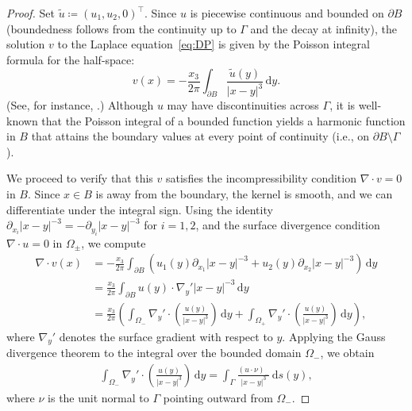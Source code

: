 \documentclass{article}
\theoremstyle{remark}
\theoremstyle{definition}
\numberwithin{equation}{section}
\begin{document}
\begin{proof}
    Set $\tilde{u}\coloneqq(u_1,u_2,0)^\top$.
    Since $u$ is piecewise continuous and bounded on $\partial B$ (boundedness follows from the continuity up to $\Gamma$ and the decay at infinity), the solution $v$ to the Laplace equation~\eqref{eq:DP} is given by the Poisson integral formula for the half-space:
    \begin{equation*}
        v(x)=-\frac{x_3}{2\pi}\int_{\partial B}\frac{\tilde{u}(y)}{|x-y|^3}\,\mathrm{d}y.
    \end{equation*}
    (See, for instance, \cite[Theorem 14 (p.~37)]{evans2010partial}.)
    Although $u$ may have discontinuities across $\Gamma$, it is well-known that the Poisson integral of a bounded function yields a harmonic function in $B$ that attains the boundary values at every point of continuity (i.e., on $\partial B \setminus \Gamma$).

    We proceed to verify that this $v$ satisfies the incompressibility condition $\nabla\cdot v=0$ in $B$.
    Since $x \in B$ is away from the boundary, the kernel is smooth, and we can differentiate under the integral sign.
    Using the identity $\partial_{x_i}|x-y|^{-3}=-\partial_{y_i}|x-y|^{-3}$ for $i=1,2$, and the surface divergence condition $\nabla\cdot u=0$ in $\Omega_\pm$, we compute
    \begin{align*}
        \nabla\cdot v(x)
        &= -\frac{x_3}{2\pi}\int_{\partial B}\left(u_1(y)\partial_{x_1}|x-y|^{-3}+u_2(y)\partial_{x_2}|x-y|^{-3}\right)\,\mathrm{d}y\\
        &= \frac{x_3}{2\pi}\int_{\partial B}u(y)\cdot\nabla_{y}'|x-y|^{-3}\,\mathrm{d}y\\
        &= \frac{x_3}{2\pi}\left(\int_{\Omega_-}\nabla_y'\cdot\left(\frac{u(y)}{|x-y|^3}\right)\,\mathrm{d}y+\int_{\Omega_+}\nabla_y'\cdot\left(\frac{u(y)}{|x-y|^3}\right)\,\mathrm{d}y\right),
    \end{align*}
    where $\nabla_y'$ denotes the surface gradient with respect to $y$.
    Applying the Gauss divergence theorem to the integral over the bounded domain $\Omega_-$, we obtain
    \begin{align*}
        \int_{\Omega_-}\nabla_y'\cdot\left(\frac{u(y)}{|x-y|^3}\right)\,\mathrm{d}y = \int_{\Gamma}\frac{(u\cdot\nu)_-}{|x-y|^3}\,\mathrm{d}s(y),
    \end{align*}
    where $\nu$ is the unit normal to $\Gamma$ pointing outward from $\Omega_-$.


\end{proof}
\end{document}

